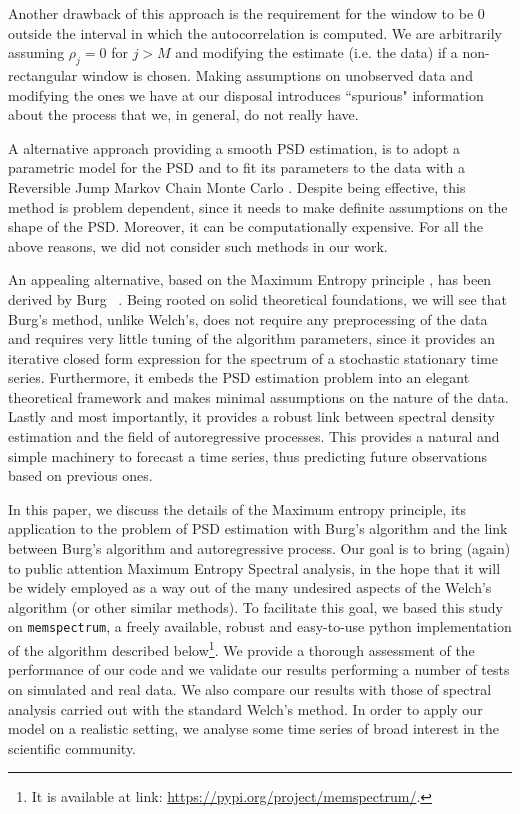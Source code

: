 \documentclass[epj,nopacs]{svjour}
\begin{document}
Another drawback of this approach is the requirement for the window to be $0$ outside the interval in which the autocorrelation is computed.
We are arbitrarily assuming $\rho_j = 0$ for $j > M$ and modifying the estimate (i.e. the data) if a non-rectangular window is chosen.
Making assumptions on unobserved data and modifying the ones we have at our disposal introduces ``spurious" information about the process that we, in general, do not really have.

A alternative approach providing a smooth PSD estimation, is to adopt a parametric model for the PSD and to fit its parameters to the data with a Reversible Jump Markov Chain Monte Carlo \cite{Cornish_2015,Littenberg_2015}. Despite being effective, this method is problem dependent, since it needs to make definite assumptions on the shape of the PSD. Moreover, it can be computationally expensive. For all the above reasons, we did not consider such methods in our work.

An appealing alternative, based on the Maximum Entropy principle \cite{JaynesArticle, jaynes2003ptl, Jaynes_MAXENT}, has been derived by Burg ~\cite{burg1975maximum}. Being rooted on solid theoretical foundations, we will see that Burg's method, unlike Welch's, does not require any preprocessing of the data and requires very little tuning of the algorithm parameters, since it provides an iterative closed form expression for the spectrum of a stochastic stationary time series. Furthermore, it embeds the PSD estimation problem into an elegant theoretical framework and makes minimal assumptions on the nature of the data.
Lastly and most importantly, it provides a robust link between spectral density estimation and the field of autoregressive processes. This provides a natural and simple machinery to forecast a time series, thus predicting future observations based on previous ones.

In this paper, we discuss the details of the Maximum entropy principle, its application to the problem of PSD estimation with Burg's algorithm and the link between Burg's algorithm and autoregressive process.
Our goal is to bring (again) to public attention Maximum Entropy Spectral analysis, in the hope that it will be widely employed as a way out of the many undesired aspects of the Welch's algorithm (or other similar methods).
To facilitate this goal, we based this study on \texttt{memspectrum}, a freely available, robust and easy-to-use python implementation of the algorithm described below\footnote{
It is available at link: \url{https://pypi.org/project/memspectrum/}.}.
We provide a thorough assessment of the performance of our code and we validate our results performing a number of tests on simulated and real data.
We also compare our results with those of spectral analysis carried out with the standard Welch's method.
In order to apply our model on a realistic setting, we analyse some time series of broad interest in the scientific community.
\end{document}
